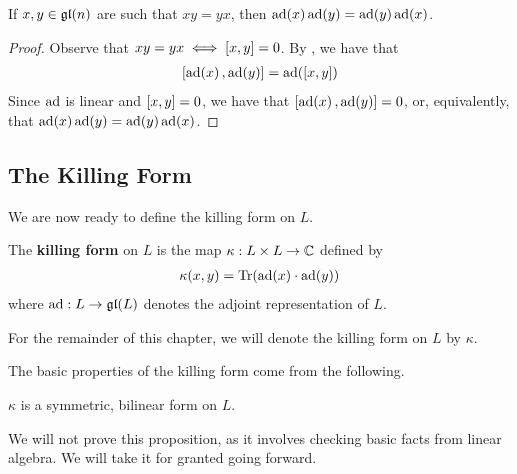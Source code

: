 \begin{lemma}
    If $x, y \in \mathfrak{gl}\!\left( n \right)$ are such that $xy = yx$, then $\operatorname{ad}\!\left( x \right) \operatorname{ad}\!\left( y \right) = \operatorname{ad}\!\left( y \right) \operatorname{ad}\!\left( x \right)$.
\end{lemma}
\begin{proof}
    Observe that $xy = yx \iff \left[ x, y \right] = 0$. By , we have that
    \begin{align*}
        \left[ \operatorname{ad}\!\left( x \right), \operatorname{ad}\!\left( y \right) \right] = \operatorname{ad}\!\left( \left[ x, y \right] \right)
    \end{align*}
    Since $\operatorname{ad}$ is linear and $\left[ x, y \right] = 0$, we have that $\left[ \operatorname{ad}\!\left( x \right), \operatorname{ad}\!\left( y \right) \right] = 0$, or, equivalently, that $\operatorname{ad}\!\left( x \right) \operatorname{ad}\!\left( y \right) = \operatorname{ad}\!\left( y \right) \operatorname{ad}\!\left( x \right)$.
\end{proof}



\subsection{The Killing Form}

We are now ready to define the killing form on $L$.

\begin{boxdefinition}
    The \textbf{killing form} on $L$ is the map $\kappa : L \times L \to \mathbb{C}$ defined by
    \begin{align}
        \kappa(x, y) = \operatorname{Tr}\!\left( \operatorname{ad}\!\left( x \right) \cdot \operatorname{ad}\!\left( y \right) \right)
    \end{align}
    where $\operatorname{ad} : L \to \mathfrak{gl}\!\left( L \right)$ denotes the adjoint representation of $L$.
\end{boxdefinition}

\begin{boxconvention}
    For the remainder of this chapter, we will denote the killing form on $L$ by $\kappa$.
\end{boxconvention}

The basic properties of the killing form come from the following.

\begin{boxproposition}
    $\kappa$ is a symmetric, bilinear form on $L$.
\end{boxproposition}

We will not prove this proposition, as it involves checking basic facts from linear algebra. We will take it for granted going forward.

